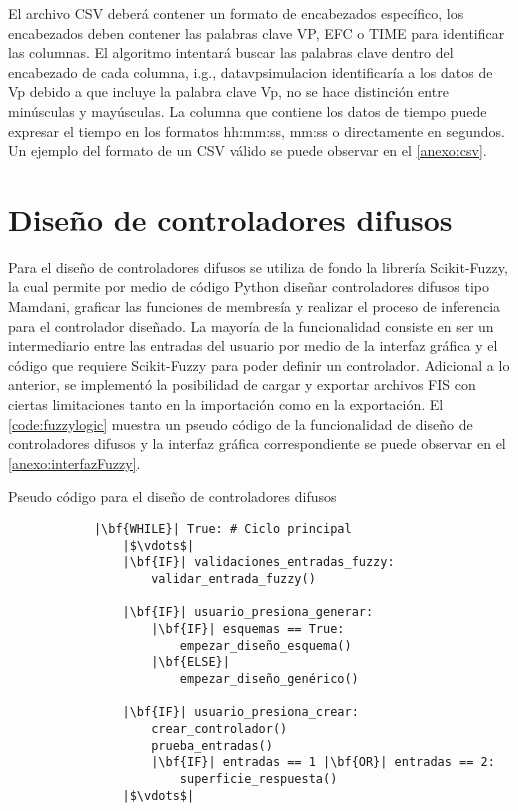         El archivo CSV deberá contener un formato de encabezados específico, los encabezados deben contener las palabras clave VP, EFC o TIME para identificar las columnas. El algoritmo intentará buscar las palabras clave dentro del encabezado de cada columna, i.g., datavpsimulacion identificaría a los datos de Vp debido a que incluye la palabra clave Vp, no se hace distinción entre minúsculas y mayúsculas. La columna que contiene los datos de tiempo puede expresar el tiempo en los formatos hh:mm:ss, mm:ss o directamente en segundos. Un ejemplo del formato de un CSV válido se puede observar en el \ref{anexo:csv}.

\section{Diseño de controladores difusos}
    
    Para el diseño de controladores difusos se utiliza de fondo la librería Scikit-Fuzzy, la cual permite por medio de código Python diseñar controladores difusos tipo Mamdani, graficar las funciones de membresía y realizar el proceso de inferencia para el controlador diseñado. La mayoría de la funcionalidad consiste en ser un intermediario entre las entradas del usuario por medio de la interfaz gráfica y el código que requiere Scikit-Fuzzy para poder definir un controlador. Adicional a lo anterior, se implementó la posibilidad de cargar y exportar archivos FIS con ciertas limitaciones tanto en la importación como en la exportación. El \cref{code:fuzzylogic} muestra un pseudo código de la funcionalidad de diseño de controladores difusos y la interfaz gráfica correspondiente se puede observar en el \ref{anexo:interfazFuzzy}.    

    \begin{longlisting}
        \caption[Pseudo código - Diseño de controladores difusos]{Pseudo código para el diseño de controladores difusos}
        \label{code:fuzzylogic}				
        \begin{verbatim}
            |\bf{WHILE}| True: # Ciclo principal
                |$\vdots$|
                |\bf{IF}| validaciones_entradas_fuzzy:
                    validar_entrada_fuzzy()
                
                |\bf{IF}| usuario_presiona_generar:
                    |\bf{IF}| esquemas == True:
                        empezar_diseño_esquema()
                    |\bf{ELSE}|
                        empezar_diseño_genérico()
                
                |\bf{IF}| usuario_presiona_crear:
                    crear_controlador()
                    prueba_entradas()
                    |\bf{IF}| entradas == 1 |\bf{OR}| entradas == 2:
                        superficie_respuesta()
                |$\vdots$|
        \end{verbatim}
    \end{longlisting}
    
